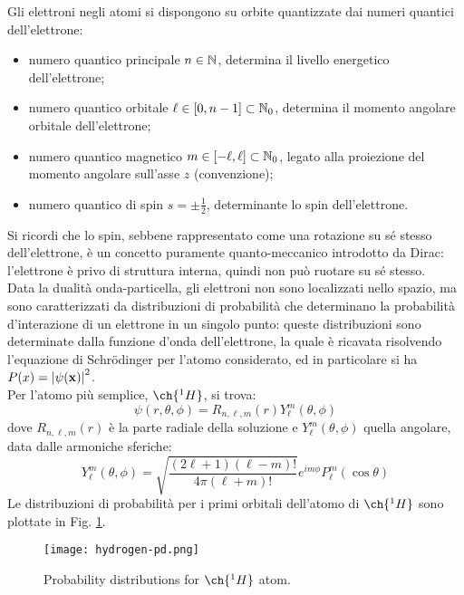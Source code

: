 Gli elettroni negli atomi si dispongono su orbite quantizzate dai numeri quantici dell'elettrone:
\begin{itemize}
	\item numero quantico principale $ n \in \mathbb{N} $, determina il livello energetico dell'elettrone;
	\item numero quantico orbitale $ \ell \in \left[ 0, n-1 \right] \subset \mathbb{N}_0 $, determina il momento angolare orbitale dell'elettrone;
	\item numero quantico magnetico $ m \in \left[ -\ell, \ell \right] \subset \mathbb{N}_0 $, legato alla proiezione del momento angolare sull'asse $ z $ (convenzione);
	\item numero quantico di spin $ s = \pm \frac{1}{2} $, determinante lo spin dell'elettrone.
\end{itemize}
Si ricordi che lo spin, sebbene rappresentato come una rotazione su sé stesso dell'elettrone, è un concetto puramente quanto-meccanico introdotto da Dirac: l'elettrone è privo di struttura interna, quindi non può ruotare su sé stesso.\\
Data la dualità onda-particella, gli elettroni non sono localizzati nello spazio, ma sono caratterizzati da distribuzioni di probabilità che determinano la probabilità d'interazione di un elettrone in un singolo punto: queste distribuzioni sono determinate dalla funzione d'onda dell'elettrone, la quale è ricavata risolvendo l'equazione di Schrödinger per l'atomo considerato, ed in particolare si ha $ P(x) = \left\lvert\psi(\mathbf{x})\right\rvert^2 $.\\
Per l'atomo più semplice, $ \ch{^1 H} $, si trova:
\begin{equation}
	\psi(r,\theta,\phi) = R_{n,\ell,m}(r) Y_{\ell}^m(\theta,\phi)
	\label{eq:1.31}
\end{equation}
dove $ R_{n,\ell,m}(r) $ è la parte radiale della soluzione e $ Y_{\ell}^m(\theta,\phi) $ quella angolare, data dalle armoniche sferiche:
\begin{equation}
	Y_{\ell}^m(\theta,\phi) = \sqrt{\frac{(2\ell+1)(\ell-m)!}{4\pi(\ell+m)!}} e^{im\phi} P_{\ell}^m(\cos\theta)
	\label{eq:1.32}
\end{equation}
Le distribuzioni di probabilità per i primi orbitali dell'atomo di $ \ch{^1 H} $ sono plottate in Fig. \ref{hyd-pd}.
\begin{figure}
	\centering
	\texttt{[image: hydrogen-pd.png]}
	\caption{Probability distributions for $ \ch{^1 H} $ atom.}
	\label{hyd-pd}
\end{figure}

